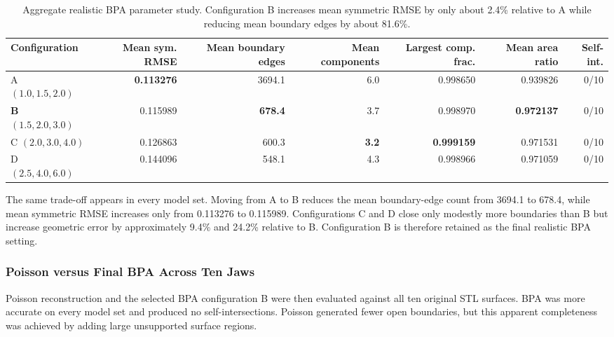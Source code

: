 \begin{table}[!t]
\centering
\footnotesize
\setlength{\tabcolsep}{4pt}
\begin{tabular}{lrrrrrr}
\toprule
\textbf{Configuration} & \textbf{Mean sym. RMSE} & \textbf{Mean boundary edges} & \textbf{Mean components} & \textbf{Largest comp. frac.} & \textbf{Mean area ratio} & \textbf{Self-int.} \\
\midrule
A $(1.0,1.5,2.0)$ & \textbf{0.113276} & 3694.1 & 6.0 & 0.998650 & 0.939826 & 0/10 \\
\textbf{B $(1.5,2.0,3.0)$} & 0.115989 & \textbf{678.4} & 3.7 & 0.998970 & \textbf{0.972137} & 0/10 \\
C $(2.0,3.0,4.0)$ & 0.126863 & 600.3 & \textbf{3.2} & \textbf{0.999159} & 0.971531 & 0/10 \\
D $(2.5,4.0,6.0)$ & 0.144096 & 548.1 & 4.3 & 0.998966 & 0.971059 & 0/10 \\
\bottomrule
\end{tabular}
\caption{Aggregate realistic BPA parameter study. Configuration B increases mean symmetric RMSE by only about 2.4\% relative to A while reducing mean boundary edges by about 81.6\%.}
\label{tab:model-suite-bpa-study}
\end{table}

The same trade-off appears in every model set. Moving from A to B reduces the mean boundary-edge count from 3694.1 to 678.4, while mean symmetric RMSE increases only from 0.113276 to 0.115989. Configurations C and D close only modestly more boundaries than B but increase geometric error by approximately 9.4\% and 24.2\% relative to B. Configuration B is therefore retained as the final realistic BPA setting.

\subsubsection{Poisson versus Final BPA Across Ten Jaws}

Poisson reconstruction and the selected BPA configuration B were then evaluated against all ten original STL surfaces. BPA was more accurate on every model set and produced no self-intersections. Poisson generated fewer open boundaries, but this apparent completeness was achieved by adding large unsupported surface regions.

